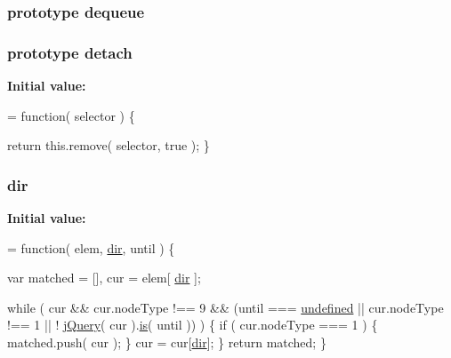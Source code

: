 \subsubsection[{dequeue}]{ {\bf prototype} dequeue}\label{jquery-1_810_82-vsdoc_8js_a721f718178dce35dc9a4bf9fe8b6de23}
\hypertarget{jquery-1_810_82-vsdoc_8js_ad1e6b5c682e0bda12ba68acb35a39eeb}{}
\subsubsection[{detach}]{ {\bf prototype} detach}\label{jquery-1_810_82-vsdoc_8js_ad1e6b5c682e0bda12ba68acb35a39eeb}
{\bfseries Initial value\+:}
\begin{DoxyCode}
= \textcolor{keyword}{function}( selector ) \{


        \textcolor{keywordflow}{return} this.\textcolor{keyword}{remove}( selector, true );
    \}
\end{DoxyCode}
\hypertarget{jquery-1_810_82-vsdoc_8js_a49baab980d9b27347df35195d88ef25f}{}
\subsubsection[{dir}]{ dir}\label{jquery-1_810_82-vsdoc_8js_a49baab980d9b27347df35195d88ef25f}
{\bfseries Initial value\+:}
\begin{DoxyCode}
= \textcolor{keyword}{function}( elem, \hyperlink{jquery-1_810_82-vsdoc_8js_a49baab980d9b27347df35195d88ef25f}{dir}, until ) \{

        var matched = [],
            cur = elem[ \hyperlink{jquery-1_810_82-vsdoc_8js_a49baab980d9b27347df35195d88ef25f}{dir} ];

        \textcolor{keywordflow}{while} ( cur && cur.nodeType !== 9 && (until === \hyperlink{jquery-1_810_82-vsdoc_8js_a08113a236cc18d2a9d5ce27e638012be}{undefined} || cur.nodeType !== 1 || !
      \hyperlink{jquery-1_810_82-vsdoc_8js_add5237586d970a38a81f990e8eb28c6c}{jQuery}( cur ).\hyperlink{jquery-1_810_82-vsdoc_8js_ab09af0fb8923d70813f6d128591d1962}{is}( until )) ) \{
            \textcolor{keywordflow}{if} ( cur.nodeType === 1 ) \{
                matched.push( cur );
            \}
            cur = cur[\hyperlink{jquery-1_810_82-vsdoc_8js_a49baab980d9b27347df35195d88ef25f}{dir}];
        \}
        \textcolor{keywordflow}{return} matched;
    \}
\end{DoxyCode}
\hypertarget{jquery-1_810_82-vsdoc_8js_a00a63bd312ef048290dc1755ccb8bae4}{}
